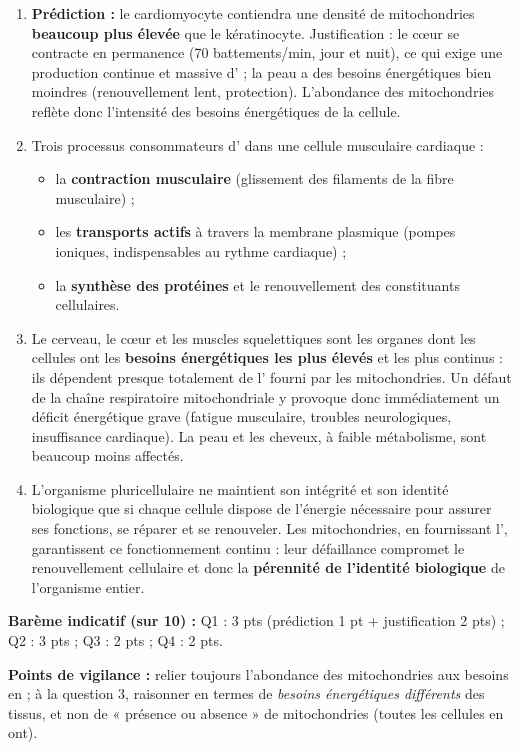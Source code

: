 \documentclass[11pt]{article}
\begin{document}
\begin{corrige}
\begin{enumerate}
    \item \textbf{Prédiction :} le cardiomyocyte contiendra une densité de mitochondries \textbf{beaucoup plus élevée} que le kératinocyte. Justification : le cœur se contracte en permanence (70 battements/min, jour et nuit), ce qui exige une production continue et massive d' ; la peau a des besoins énergétiques bien moindres (renouvellement lent, protection). L'abondance des mitochondries reflète donc l'intensité des besoins énergétiques de la cellule.
    \item Trois processus consommateurs d' dans une cellule musculaire cardiaque :
    \begin{itemize}
        \item la \textbf{contraction musculaire} (glissement des filaments de la fibre musculaire) ;
        \item les \textbf{transports actifs} à travers la membrane plasmique (pompes ioniques, indispensables au rythme cardiaque) ;
        \item la \textbf{synthèse des protéines} et le renouvellement des constituants cellulaires.
    \end{itemize}
    \item Le cerveau, le cœur et les muscles squelettiques sont les organes dont les cellules ont les \textbf{besoins énergétiques les plus élevés} et les plus continus : ils dépendent presque totalement de l' fourni par les mitochondries. Un défaut de la chaîne respiratoire mitochondriale y provoque donc immédiatement un déficit énergétique grave (fatigue musculaire, troubles neurologiques, insuffisance cardiaque). La peau et les cheveux, à faible métabolisme, sont beaucoup moins affectés.
    \item L'organisme pluricellulaire ne maintient son intégrité et son identité biologique que si chaque cellule dispose de l'énergie nécessaire pour assurer ses fonctions, se réparer et se renouveler. Les mitochondries, en fournissant l', garantissent ce fonctionnement continu : leur défaillance compromet le renouvellement cellulaire et donc la \textbf{pérennité de l'identité biologique} de l'organisme entier.
\end{enumerate}
\textbf{Barème indicatif (sur 10) :} Q1 : 3 pts (prédiction 1 pt + justification 2 pts) ; Q2 : 3 pts ; Q3 : 2 pts ; Q4 : 2 pts.\par
\textbf{Points de vigilance :} relier toujours l'abondance des mitochondries aux besoins en  ; à la question 3, raisonner en termes de \emph{besoins énergétiques différents} des tissus, et non de « présence ou absence » de mitochondries (toutes les cellules en ont).
\end{corrige}
\end{document}

